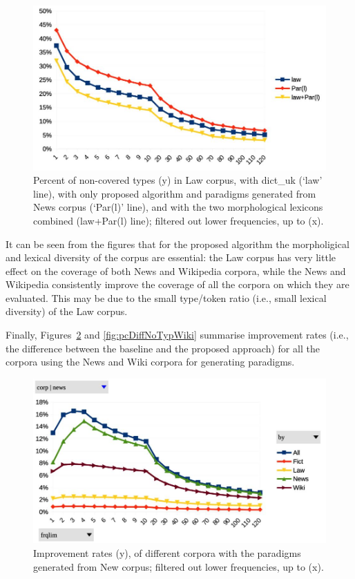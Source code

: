\documentclass[11pt,a4paper]{article}
\begin{document}
\begin{figure}
	\includegraphics[width=\linewidth]{evaluation-coverage-lawN.jpg}
	\caption{Percent of non-covered types (y) in Law corpus, with dict\_uk (`law' line), with only proposed algorithm and paradigms generated from News corpus (`Par(l)' line), and with the two morphological lexicons combined (law+Par(l) line); filtered out lower frequencies, up to (x).}
	\label{fig:pcNoTypLawN}
\end{figure}


It can be seen from the figures that for the proposed algorithm the morpholigical and lexical diversity of the corpus are essential: the Law corpus has very little effect on the coverage of both News and Wikipedia corpora, while the News and Wikipedia consistently improve the coverage of all the corpora on which they are evaluated. This may be due to the small type/token ratio (i.e., small lexical diversity) of the Law corpus.

Finally, Figures~\ref{fig:pcDiffNoTypNews} and \ref{fig:pcDiffNoTypWiki} summarise improvement rates (i.e., the difference between the baseline and the proposed approach) for all the corpora using the News and Wiki corpora for generating paradigms.

\begin{figure}
	\includegraphics[width=\linewidth]{evaluation-improv-DiffNoTypNews.jpg}
	\caption{Improvement rates (y), of different corpora with the paradigms generated from New corpus; filtered out lower frequencies, up to (x).}
	\label{fig:pcDiffNoTypNews}
\end{figure}
\end{document}
